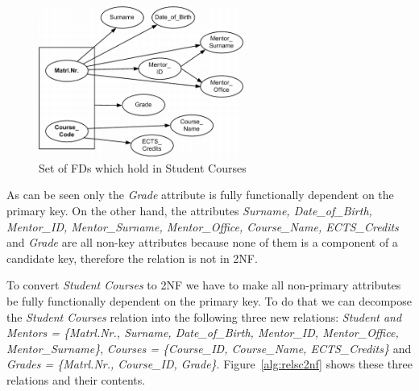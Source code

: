 \begin{figure}[h]
  \begin{center}
    \includegraphics[width=0.6\textwidth]{./img/fds01b.png}
    \caption{Set of FDs which hold in Student Courses}
    \label{fig:fds01a}
  \end{center}
\end{figure}

As can be seen only the \textit{Grade} attribute is fully functionally dependent on the primary key.
On the other hand, the attributes \textit{Surname, Date\_of\_Birth, Mentor\_ID, Mentor\_Surname, Mentor\_Office, Course\_Name, ECTS\_Credits} 
and \textit{Grade} are all non-key attributes because none of them is a component of a candidate key, therefore
the relation is not in 2NF. 

To convert \textit{Student Courses} to 2NF we have to make all non-primary attributes 
be fully functionally dependent on the primary key. 
To do that we can decompose the \textit{Student Courses} relation into the following three new relations:
\textit{Student and Mentors = \{Matrl.Nr., Surname, Date\_of\_Birth, Mentor\_ID, Mentor\_Office, Mentor\_Surname\}}, 
\textit{Courses = \{Course\_ID, Course\_Name, ECTS\_Credits\}} and 
\textit{Grades = \{Matrl.Nr., Course\_ID,  Grade\}}.
Figure~\ref{alg:relsc2nf} shows these three relations and their contents.


